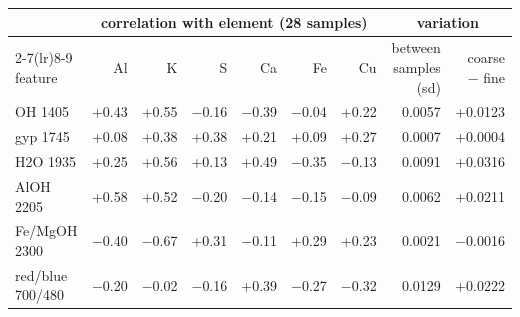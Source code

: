 \begin{tabular}{lrrrrrrrr}
\toprule
& \multicolumn{6}{c}{correlation with element (28 samples)} & \multicolumn{2}{c}{variation} \\ \cmidrule(lr){2-7}\cmidrule(lr){8-9}
feature & Al & K & S & Ca & Fe & Cu & between samples (sd) & coarse $-$ fine \\
\midrule
OH 1405 & +0.43 & +0.55 & $-$0.16 & $-$0.39 & $-$0.04 & +0.22 & 0.0057 & +0.0123 \\
gyp 1745 & +0.08 & +0.38 & +0.38 & +0.21 & +0.09 & +0.27 & 0.0007 & +0.0004 \\
H2O 1935 & +0.25 & +0.56 & +0.13 & +0.49 & $-$0.35 & $-$0.13 & 0.0091 & +0.0316 \\
AlOH 2205 & +0.58 & +0.52 & $-$0.20 & $-$0.14 & $-$0.15 & $-$0.09 & 0.0062 & +0.0211 \\
Fe/MgOH 2300 & $-$0.40 & $-$0.67 & +0.31 & $-$0.11 & +0.29 & +0.23 & 0.0021 & $-$0.0016 \\
red/blue 700/480 & $-$0.20 & $-$0.02 & $-$0.16 & +0.39 & $-$0.27 & $-$0.32 & 0.0129 & +0.0222 \\
\bottomrule
\end{tabular}
